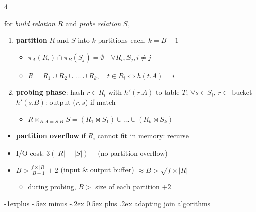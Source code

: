 \documentclass{article}
\makeatletter
\renewcommand{\subsection}{\@startsection{subsection}{2}{0mm}%
    {-1explus -.5ex minus -.2ex}%
    {0.5ex plus .2ex}%
{\normalfont\footnotesize\bfseries}}
\makeatother
\begin{document}
\begin{multicols*}{4}
\begin{scriptsize}
  for \textit{build relation} $R$ and \textit{probe relation} $S$,
  \begin{enumerate}
    \item \textbf{partition} $R$ and $S$ into  $k$ partitions each, $k=B-1$
      \begin{itemize}
        \item $\pi_A(R_i) \cap \pi_B(S_j) = \emptyset \quad \forall R_i, S_j, i \neq j$
        \item $R = R_1 \cup R_2 \cup \dots \cup R_k, \quad t \in R_i \iff h(t.A)=i$
      \end{itemize}
    \item \textbf{probing phase}: hash $r \in R_i$ with $h'(r.A)$ to table $T$;
      $\forall s \in S_i$, $r \in$ bucket $h'(s.B)$: output ($r,s$) if match
      \begin{itemize}
        \item $R \bowtie_{R.A=S.B} S = (R_1 \bowtie S_1) \cup \dots \cup (R_k \bowtie S_k)$
      \end{itemize} 
  \end{enumerate}

  \begin{itemize}
    \item \textbf{partition overflow} if $R_i$ cannot fit in memory: recurse
    \item I/O cost: $3(|R|+|S|) \quad$ (no partition overflow)
    \item $B > \frac{f \times |R|}{B-1} + 2$ (input \& output buffer) $\approx B > \sqrt{f\times |R|}$
      \begin{itemize}
        \item during probing, $B >$ size of each partition $+ 2$
      \end{itemize}
  \end{itemize}

  \subsection{adapting join algorithms}


\end{scriptsize}
\end{multicols*}
\end{document}
